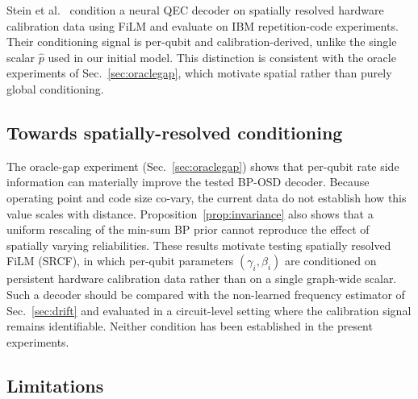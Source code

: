 \documentclass[a4paper,twocolumn,11pt,nopdfoutputerror]{quantumarticle}
\newcommand{\phat}{\hat{p}}
\begin{document}
Stein et al.~\cite{Stein2026FiLM} condition a neural QEC decoder on
spatially resolved hardware calibration data using FiLM and evaluate on
IBM repetition-code experiments. Their conditioning signal is per-qubit
and calibration-derived, unlike the single scalar $\phat$ used in our
initial model. This distinction is consistent with the oracle experiments
of Sec.~\ref{sec:oraclegap}, which motivate spatial rather than purely
global conditioning.
\subsection{Towards spatially-resolved conditioning}\label{sec:srcf}

The oracle-gap experiment (Sec.~\ref{sec:oraclegap}) shows that
per-qubit rate side information can materially improve the tested
BP-OSD decoder. Because operating point and code size co-vary, the
current data do not establish how this value scales with distance.
Proposition~\ref{prop:invariance} also shows that a uniform rescaling
of the min-sum BP prior cannot reproduce the effect of spatially varying
reliabilities. These results motivate testing spatially resolved FiLM
(SRCF), in which per-qubit parameters $(\gamma_i, \beta_i)$ are
conditioned on persistent hardware calibration data rather than on a
single graph-wide scalar. Such a decoder should be compared with the
non-learned frequency estimator of Sec.~\ref{sec:drift} and evaluated
in a circuit-level setting where the calibration signal remains
identifiable. Neither condition has been established in the present
experiments.

\subsection{Limitations}\label{sec:limitations}
\end{document}
